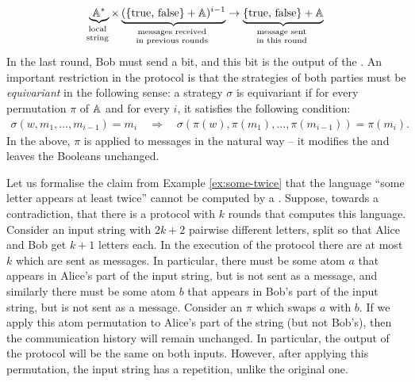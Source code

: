 \begin{align*}
\myunderbrace{\atoms^*}{local \\ string} \times \myunderbrace{(\set{\text{true, false}} + \atoms)^{i-1}}{messages received \\ in previous rounds} 
\to
\myunderbrace{\set{\text{true, false}} + \atoms}{message sent \\ in this round}
\end{align*}
In the last round, Bob must send a bit, and this bit is the output of the .
An important restriction in the protocol is that the strategies of both parties must be \emph{equivariant} in the following sense: 
a strategy $\sigma$ is equivariant if for every permutation $\pi$ of $\mathbb A$ and for every $i$, it satisfies the following condition:
\begin{align*}
\sigma(w, m_1, \ldots, m_{i-1}) = m_i 
\quad \Rightarrow \quad
\sigma(\pi(w), \pi(m_1), \ldots, \pi(m_{i-1})) = \pi(m_i).
\end{align*}
In the above, $\pi$ is applied to messages in the natural way -- 
it modifies the  and leaves the Booleans unchanged.

\begin{myexample}
    Let us formalise the claim from Example \ref{ex:some-twice} that the
    language ``some letter appears at least twice'' cannot be computed by a
    . 
    Suppose, towards a contradiction, that there is a protocol with
    $k$ rounds that computes this language. Consider an input string with
    $2k+2$ pairwise different letters, split so that Alice and Bob get $k+1$
    letters each. In the execution of the protocol there are at most $k$ 
    which are sent as messages. In particular, there must be some atom $a$ that
    appears in Alice's part of the input string, but is not sent as a message,
    and similarly there must be some atom $b$ that appears in Bob's part of the
    input string, but is not sent as a message. Consider an 
    $\pi$ which swaps $a$ with $b$. If we apply this atom permutation to
    Alice's part of the string (but not Bob's), then the communication history
    will remain unchanged. In particular, the output of the protocol will be
    the same on both inputs. However, after applying this permutation, the
    input string has a repetition, unlike the original one. 
\end{myexample}


